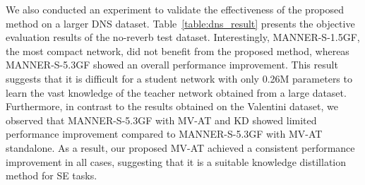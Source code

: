 \documentclass[a4paper]{article}
\begin{document}
We also conducted an experiment to validate the effectiveness of the proposed method on a larger DNS dataset. Table~\ref{table:dns_result} presents the objective evaluation results of the no-reverb test dataset. Interestingly, MANNER-S-1.5GF, the most compact network, did not benefit from the proposed method, whereas MANNER-S-5.3GF showed an overall performance improvement. This result suggests that it is difficult for a student network with only 0.26M parameters to learn the vast knowledge of the teacher network obtained from a large dataset. Furthermore, in contrast to the results obtained on the Valentini dataset, we observed that MANNER-S-5.3GF with MV-AT and KD showed limited performance improvement compared to MANNER-S-5.3GF with MV-AT standalone. As a result, our proposed MV-AT achieved a consistent performance improvement in all cases, suggesting that it is a suitable knowledge distillation method for SE tasks.
\begin{table}[th]
\caption{Ablation study for the MANNER-S-1.5GF model with L=3, C=12 using the Valentini dataset. ${\dagger}$ indicates that dual-depth knowledge transfer is employed.}
\label{table:ablation}
\centering
{}
\end{table}
\end{document}
